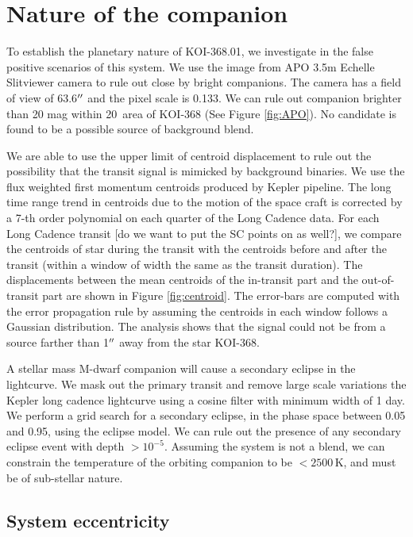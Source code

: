 \documentclass[preprint]{emulateapj}
\begin{document}
\section{Nature of the companion}
\label{sec:nature-companion}

To establish the planetary nature of KOI-368.01, we investigate in the 
false positive scenarios of this system. We use the image from APO 3.5m 
Echelle Slitviewer camera to rule out close by bright companions. The 
camera has a field of view of 63.6$\mbox{$^{\prime\prime}$}$ and the pixel scale is 0.133\pxs. 
We can rule out companion brighter than 20 mag within 20\sqarcsec\ 
area of KOI-368 (See Figure \ref{fig:APO}). No candidate is found to be 
a possible source of background blend. 

We are able to use the upper limit of centroid displacement to rule out the 
possibility that the transit signal is mimicked by background binaries. We 
use the flux weighted first momentum centroids produced by Kepler 
pipeline. The long time range trend in centroids due to the motion of 
the space craft is corrected by a 7-th order polynomial on each quarter 
of the Long Cadence data. For each Long Cadence transit [do we want to put 
the SC points on as well?], we compare the centroids of star during the 
transit with the centroids before and after the transit (within a window 
of width the same as the transit duration). The displacements between the 
mean centroids of the in-transit part and the out-of-transit part are shown 
in Figure \ref{fig:centroid}. The error-bars are computed with the error 
propagation rule by assuming the centroids in each window follows a 
Gaussian distribution. The analysis shows that the signal could not be 
from a source farther than 1$\mbox{$^{\prime\prime}$}$ away from the star KOI-368.  

A stellar mass M-dwarf companion will cause a secondary eclipse in the
lightcurve. We mask out the primary transit and remove large scale
variations the Kepler long cadence lightcurve using a cosine filter
with minimum width of 1 day. We perform a grid
search for a secondary eclipse, in the phase space between 0.05 and
0.95, using the \citet{Mandel2002} eclipse model. We can rule out the
presence of any secondary eclipse event with depth
$>10^{-5}$. Assuming the system is not a blend, we can constrain the
temperature of the orbiting companion to be $< 2500\,\text{K}$, and
must be of sub-stellar nature.

\subsection{System eccentricity}
\label{sec:system-eccentricity}
\end{document}
